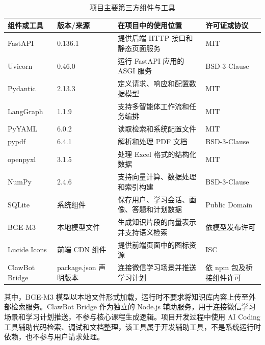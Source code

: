 \begin{table}[H]
\centering
\small
\begin{tabularx}{\linewidth}{p{3.2cm}p{2.5cm}X p{2.5cm}}
\toprule
组件或工具 & 版本/来源 & 在项目中的使用位置 & 许可证或协议 \\
\midrule
FastAPI & 0.136.1 & 提供后端 HTTP 接口和静态页面服务 & MIT \\
Uvicorn & 0.46.0 & 运行 FastAPI 应用的 ASGI 服务 & BSD-3-Clause \\
Pydantic & 2.13.3 & 定义请求、响应和配置数据模型 & MIT \\
LangGraph & 1.1.9 & 支持多智能体工作流和任务编排 & MIT \\
PyYAML & 6.0.2 & 读取检索和系统配置文件 & MIT \\
pypdf & 6.4.1 & 解析和处理 PDF 文档 & BSD-3-Clause \\
openpyxl & 3.1.5 & 处理 Excel 格式的结构化数据 & MIT \\
NumPy & 2.4.6 & 支持向量计算、数据处理和索引构建 & BSD-3-Clause \\
SQLite & 系统组件 & 保存用户、学习会话、画像、答题和计划数据 & Public Domain \\
BGE-M3 & 本地模型文件 & 生成知识片段的向量表示并支持语义检索 & 依模型发布许可 \\
Lucide Icons & 前端 CDN 组件 & 提供前端页面中的图标资源 & ISC \\
ClawBot Bridge & package.json 声明版本 & 连接微信学习场景并推送学习计划 & 依 npm 包及桥接组件许可 \\
\bottomrule
\end{tabularx}
\caption{项目主要第三方组件与工具}
\end{table}

其中，BGE-M3 模型以本地文件形式加载，运行时不要求将知识库内容上传至外部检索服务。ClawBot Bridge 作为独立的 Node.js 辅助服务，用于连接微信学习场景和学习计划推送，不参与核心课程生成逻辑。项目开发过程中使用 AI Coding 工具辅助代码检索、调试和文档整理，该工具属于开发辅助工具，不是系统运行时依赖，也不参与用户请求处理。
